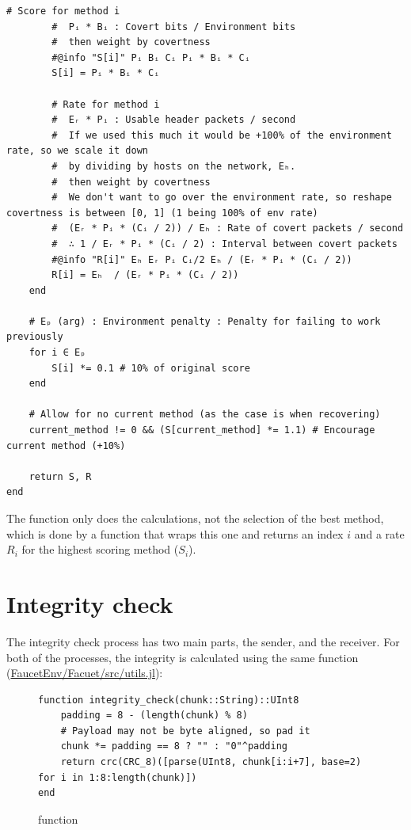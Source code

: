 \begin{lstlisting}[language=JuliaLocal, style=julia]
        # Score for method i
        #  Pᵢ * Bᵢ : Covert bits / Environment bits
        #  then weight by covertness
        #@info "S[i]" Pᵢ Bᵢ Cᵢ Pᵢ * Bᵢ * Cᵢ
        S[i] = Pᵢ * Bᵢ * Cᵢ

        # Rate for method i
        #  Eᵣ * Pᵢ : Usable header packets / second
        #  If we used this much it would be +100% of the environment rate, so we scale it down
        #  by dividing by hosts on the network, Eₕ.
        #  then weight by covertness
        #  We don't want to go over the environment rate, so reshape covertness is between [0, 1] (1 being 100% of env rate)
        #  (Eᵣ * Pᵢ * (Cᵢ / 2)) / Eₕ : Rate of covert packets / second
        #  ∴ 1 / Eᵣ * Pᵢ * (Cᵢ / 2) : Interval between covert packets
        #@info "R[i]" Eₕ Eᵣ Pᵢ Cᵢ/2 Eₕ / (Eᵣ * Pᵢ * (Cᵢ / 2))
        R[i] = Eₕ  / (Eᵣ * Pᵢ * (Cᵢ / 2)) 
    end

    # Eₚ (arg) : Environment penalty : Penalty for failing to work previously
    for i ∈ Eₚ
        S[i] *= 0.1 # 10% of original score
    end

    # Allow for no current method (as the case is when recovering)
    current_method != 0 && (S[current_method] *= 1.1) # Encourage current method (+10%)

    return S, R
end
\end{lstlisting}

The  function only does the calculations, not the selection of the best method, which is done by a function that wraps this one and returns an index $i$ and a rate $R_i$ for the highest scoring method ($S_i$).

\section{Integrity check}
\label{sec:integrity_impl}

The integrity check process has two main parts, the sender, and the receiver. For both of the processes, the integrity is calculated using the same function (\url{FaucetEnv/Facuet/src/utils.jl}):

\begin{figure}[h]
\begin{lstlisting}[language=JuliaLocal, style=julia]
function integrity_check(chunk::String)::UInt8
    padding = 8 - (length(chunk) % 8)
    # Payload may not be byte aligned, so pad it
    chunk *= padding == 8 ? "" : "0"^padding
    return crc(CRC_8)([parse(UInt8, chunk[i:i+7], base=2) for i in 1:8:length(chunk)])
end
\end{lstlisting}
\caption{ function}
\end{figure}

